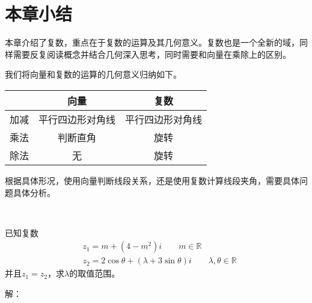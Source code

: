 \section{本章小结}

本章介绍了复数，重点在于复数的运算及其几何意义。复数也是一个全新的域，同样需要反复阅读概念并结合几何深入思考，同时需要和向量在乘除上的区别。

我们将向量和复数的运算的几何意义归纳如下。

\begin{table}[ht]
\centering
\begin{tabular}{ccc}
    \toprule
     & 向量 & 复数\\
    \midrule
    加减 & 平行四边形对角线 & 平行四边形对角线\\
    乘法 & 判断直角 & 旋转\\
    除法 & 无 & 旋转\\
    \bottomrule
\end{tabular}
\end{table}

根据具体形况，使用向量判断线段关系，还是使用复数计算线段夹角，需要具体问题具体分析。

~

\begin{example}
已知复数
\begin{align*}
&z_1=m+\left( 4-m^2 \right) i \qquad m\in \mathbb{R} \\
&z_2=2\cos \theta +\left( \lambda +3\sin \theta \right) i \qquad \lambda ,\theta \in \mathbb{R}
\end{align*}
并且$z_1=z_2$，求$\lambda $的取值范围。
\end{example}

解：

